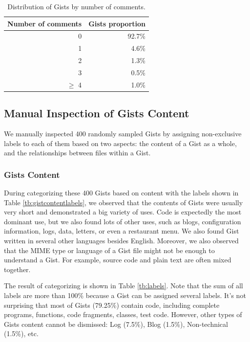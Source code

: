 \begin{table}[!htb]
 \begin{center}
 \begin{tabular}{@{}rr} 
    \textbf{Number of comments} &   \textbf{Gists proportion}\\ \hline
    0 &   92.7\% \\ 
    1 &   4.6\% \\ 
    2 &   1.3\% \\ 
    3 &   0.5\% \\ 
    $\geq$ 4 &   1.0\%\\ \hline
 \end{tabular}
 \end{center}
 \caption{Distribution of Gists by number of comments.}
 \label{tb:comments}
\end{table}

\subsection{Manual Inspection of Gists Content}

We manually inspected 400 randomly sampled Gists by assigning non-exclusive labels to each of them based on two aspects: the content of a Gist as a whole, and the relationships between files within a Gist. 

\subsubsection{Gists Content}
During categorizing these 400 Gists based on content with the labels shown in Table \ref{tb:gistcontentlabels}, we observed that the contents of Gists were usually very short and demonstrated a big variety of uses. Code is expectedly the most dominant use, but we also found lots of other uses, such as blogs, configuration information, logs, data, letters, or even a restaurant menu. We also found Gist written in several other languages besides English. Moreover, we also observed that the MIME type or language of a Gist file might not be enough to understand a Gist. For example, source code and plain text are often mixed together.

The result of categorizing is shown in Table \ref{tb:labels}. Note that the sum of all labels are more than 100\% because a Gist can be assigned several labels. It's not surprising that most of Gists (79.25\%) contain code, including complete programs, functions, code fragments, classes, test code. However, other types of Gists content cannot be dismissed: Log (7.5\%), Blog (1.5\%), Non-technical (1.5\%), etc.

